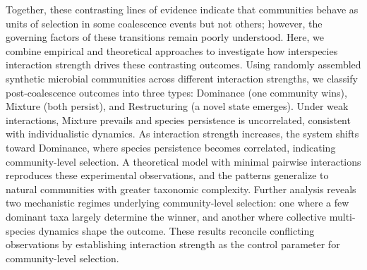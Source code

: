 Together, these contrasting lines of evidence indicate that communities behave as units of selection in some coalescence events but not others; however, the governing factors of these transitions remain poorly understood. Here, we combine empirical and theoretical approaches to investigate how interspecies interaction strength drives these contrasting outcomes. Using randomly assembled synthetic microbial communities across different interaction strengths, we classify post-coalescence outcomes into three types: Dominance (one community wins), Mixture (both persist), and Restructuring (a novel state emerges). Under weak interactions, Mixture prevails and species persistence is uncorrelated, consistent with individualistic dynamics. As interaction strength increases, the system shifts toward Dominance, where species persistence becomes correlated, indicating community-level selection. A theoretical model with minimal pairwise interactions reproduces these experimental observations, and the patterns generalize to natural communities with greater taxonomic complexity. Further analysis reveals two mechanistic regimes underlying community-level selection: one where a few dominant taxa largely determine the winner, and another where collective multi-species dynamics shape the outcome. These results reconcile conflicting observations by establishing interaction strength as the control parameter for community-level selection.
